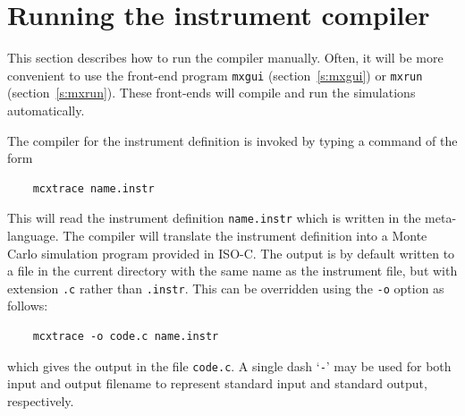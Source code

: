 %

\section{Running the instrument compiler}
\label{s:running}

This section describes how to run the \MCX compiler manually. Often,
it will be more convenient to use the front-end program \verb+mxgui+
(section~\ref{s:mxgui}) or \verb+mxrun+ (section~\ref{s:mxrun}). These
front-ends will compile and run the simulations automatically.
 

The compiler for the \MCX instrument definition
is invoked by typing a command of the form
\begin{verbatim}
    mcxtrace name.instr
\end{verbatim}
This will read the instrument definition \verb+name.instr+ which is
written in the \MCX meta-language. The compiler will translate the
instrument definition into a Monte Carlo simulation program provided in
ISO-C. The output is by default written to a file in the current
directory with the same name as the instrument file, but with extension
\verb+.c+ rather than \verb+.instr+. This can be overridden using the
\verb+-o+ option as follows:
\begin{verbatim}
    mcxtrace -o code.c name.instr
\end{verbatim}
which gives the output in the file \verb+code.c+.
A single dash `\verb+-+' may be used for both input and output filename
to represent standard input and standard output, respectively.


